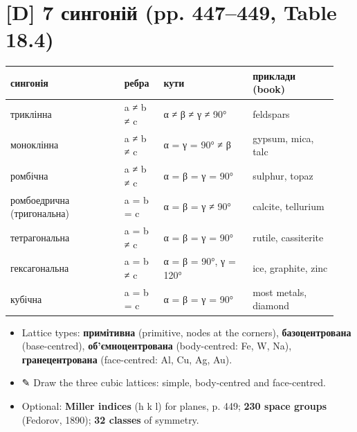 \documentclass[11pt,a4paper,oneside]{book}
\newcommand{\pen}{{\sffamily\color{accent}✎}}
\begin{document}
\section*{[D] 7 сингоній (pp. 447–449, Table 18.4)}
{\small
\begin{longtable}{>{\raggedright\arraybackslash}p{0.320\linewidth}>{\raggedright\arraybackslash}p{0.111\linewidth}>{\raggedright\arraybackslash}p{0.259\linewidth}>{\raggedright\arraybackslash}p{0.246\linewidth}}
\toprule
\textbf{сингонія} & \textbf{ребра} & \textbf{кути} & \textbf{приклади (book)} \\
\midrule
\endhead
триклінна & a ≠ b ≠ c & α ≠ β ≠ γ ≠ 90° & feldspars \\
моноклінна & a ≠ b ≠ c & α = γ = 90° ≠ β & gypsum, mica, talc \\
ромбічна & a ≠ b ≠ c & α = β = γ = 90° & sulphur, topaz \\
ромбоедрична (тригональна) & a = b = c & α = β = γ ≠ 90° & calcite, tellurium \\
тетрагональна & a = b ≠ c & α = β = γ = 90° & rutile, cassiterite \\
гексагональна & a = b ≠ c & α = β = 90°, γ = 120° & ice, graphite, zinc \\
кубічна & a = b = c & α = β = γ = 90° & most metals, diamond \\
\bottomrule
\end{longtable}
}
\begin{itemize}
\item Lattice types: \textbf{примітивна} (primitive, nodes at the corners), \textbf{базоцентрована} (base-centred), \textbf{об'ємноцентрована} (body-centred: Fe, W, Na), \textbf{гранецентрована} (face-centred: Al, Cu, Ag, Au).
\item \pen{} Draw the three cubic lattices: simple, body-centred and face-centred.
\item Optional: \textbf{Miller indices} (h k l) for planes, p. 449; \textbf{230 space groups} (Fedorov, 1890); \textbf{32 classes} of symmetry.
\end{itemize}
\end{document}
